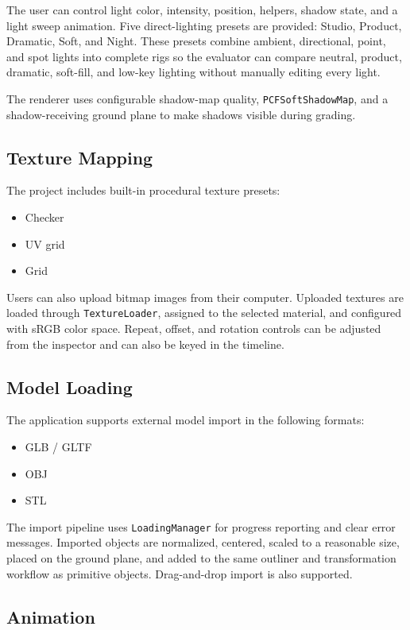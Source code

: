 \documentclass[12pt,a4paper]{article}
\begin{document}
The user can control light color, intensity, position, helpers, shadow state,
and a light sweep animation. Five direct-lighting presets are provided:
Studio, Product, Dramatic, Soft, and Night. These presets combine ambient,
directional, point, and spot lights into complete rigs so the evaluator can
compare neutral, product, dramatic, soft-fill, and low-key lighting without
manually editing every light.

The renderer uses configurable shadow-map quality, \texttt{PCFSoftShadowMap},
and a shadow-receiving ground plane to make shadows visible during grading.

\subsection{Texture Mapping}

The project includes built-in procedural texture presets:
\begin{itemize}
  \item Checker
  \item UV grid
  \item Grid
\end{itemize}

Users can also upload bitmap images from their computer. Uploaded textures are
loaded through \texttt{TextureLoader}, assigned to the selected material, and
configured with sRGB color space. Repeat, offset, and rotation controls can be
adjusted from the inspector and can also be keyed in the timeline.

\subsection{Model Loading}

The application supports external model import in the following formats:
\begin{itemize}
  \item GLB / GLTF
  \item OBJ
  \item STL
\end{itemize}

The import pipeline uses \texttt{LoadingManager} for progress reporting and
clear error messages. Imported objects are normalized, centered, scaled to a
reasonable size, placed on the ground plane, and added to the same outliner and
transformation workflow as primitive objects. Drag-and-drop import is also
supported.

\subsection{Animation}
\end{document}
